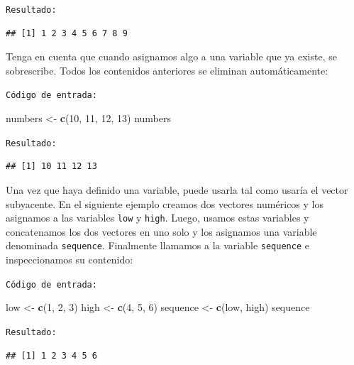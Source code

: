 \documentclass[
]{book}
\newenvironment{Shaded}{\begin{snugshade}}{\end{snugshade}}
\newcommand{\DecValTok}[1]{\textcolor[rgb]{0.00,0.00,0.81}{#1}}
\newcommand{\KeywordTok}[1]{\textcolor[rgb]{0.13,0.29,0.53}{\textbf{#1}}}
\newcommand{\NormalTok}[1]{#1}
\newcommand{\StringTok}[1]{\textcolor[rgb]{0.31,0.60,0.02}{#1}}
\begin{document}
\texttt{Resultado:}

\begin{verbatim}
## [1] 1 2 3 4 5 6 7 8 9
\end{verbatim}

Tenga en cuenta que cuando asignamos algo a una variable que ya existe, se sobrescribe. Todos los contenidos anteriores se eliminan automáticamente:

\texttt{Código\ de\ entrada:}

\begin{Shaded}
\begin{Highlighting}[]
\NormalTok{numbers <-}\StringTok{ }\KeywordTok{c}\NormalTok{(}\DecValTok{10}\NormalTok{, }\DecValTok{11}\NormalTok{, }\DecValTok{12}\NormalTok{, }\DecValTok{13}\NormalTok{)}
\NormalTok{numbers}
\end{Highlighting}
\end{Shaded}

\texttt{Resultado:}

\begin{verbatim}
## [1] 10 11 12 13
\end{verbatim}

Una vez que haya definido una variable, puede usarla tal como usaría el vector subyacente. En el siguiente ejemplo creamos dos vectores numéricos y los asignamos a las variables \texttt{low} y \texttt{high}. Luego, usamos estas variables y concatenamos los dos vectores en uno solo y los asignamos una variable denominada \texttt{sequence}. Finalmente llamamos a la variable \texttt{sequence} e inspeccionamos su contenido:

\texttt{Código\ de\ entrada:}

\begin{Shaded}
\begin{Highlighting}[]
\NormalTok{low <-}\StringTok{ }\KeywordTok{c}\NormalTok{(}\DecValTok{1}\NormalTok{, }\DecValTok{2}\NormalTok{, }\DecValTok{3}\NormalTok{)}
\NormalTok{high <-}\StringTok{ }\KeywordTok{c}\NormalTok{(}\DecValTok{4}\NormalTok{, }\DecValTok{5}\NormalTok{, }\DecValTok{6}\NormalTok{)}
\NormalTok{sequence <-}\StringTok{ }\KeywordTok{c}\NormalTok{(low, high)}
\NormalTok{sequence}
\end{Highlighting}
\end{Shaded}

\texttt{Resultado:}

\begin{verbatim}
## [1] 1 2 3 4 5 6
\end{verbatim}
\end{document}
